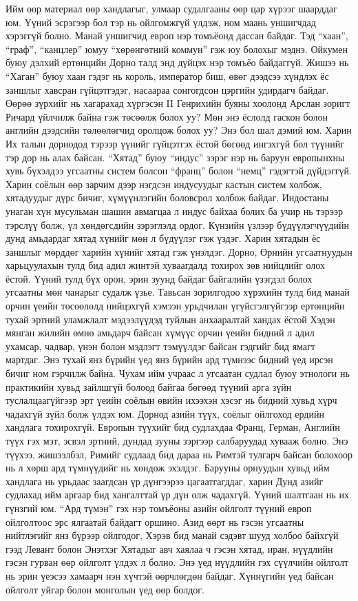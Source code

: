 Ийм өөр материал өөр хандлагыг, улмаар судалгааны өөр цар хүрээг шаарддаг юм. Үүний эсрэгээр бол тэр нь ойлгомжгүй үлдэж, ном маань уншигчдад хэрэггүй болно. Манай уншигчид европ нэр томъёонд дассан байдаг. Тэд “хаан”, “граф”, “канцлер” юмуу “хөрөнгөтний коммун” гэж юу болохыг мэднэ. Ойкумен буюу дэлхий ертөнцийн Дорно талд энд дүйцэх нэр томъёо байдаггүй. Жишээ нь “Хаган” буюу хаан гэдэг нь король, император биш, өвөг дээдсээ хүндлэх ёс заншлыг хавсран гүйцэтгэдэг, насаараа сонгогдсон цэргийн удирдагч байдаг. Өөрөө зүрхийг нь хагарахад хүргэсэн II Генрихийн буяны хоолонд Арслан зоригт Ричард үйлчилж байна гэж төсөөлж болох уу? Мөн энэ ёслолд гаскон болон английн дээдсийн төлөөлөгчид оролцож болох уу? Энэ бол шал дэмий юм. Харин Их талын дорнодод тэрээр үүнийг гүйцэтгэх ёстой бөгөөд ингэхгүй бол түүнийг тэр дор нь алах байсан.
“Хятад” буюу “индус” зэрэг нэр нь баруун европынхны хувь бүхэлдээ угсаатны систем болсон “франц” болон “немц” гэдэгтэй дүйдэггүй. Харин соёлын өөр зарчим дээр нэгдсэн индусуудыг кастын систем холбож, хятадуудыг дүрс бичиг, хүмүүнлэгийн боловсрол холбож байдаг. Индостаны унаган хүн мусульман шашин авмагцаа л индус байхаа болих ба учир нь тэрээр тэрслүү болж, үл хөндөгсдийн зэрэглэлд ордог. Күнзийн үзлээр бүдүүлэгчүүдийн дунд амьдардаг хятад хүнийг мөн л бүдүүлэг гэж үздэг. Харин хятадын ёс заншлыг мөрддөг харийн хүнийг хятад гэж үнэлдэг.
Дорно, Өрнийн угсаатнуудын харьцуулахын тулд бид адил жинтэй хуваагдалд тохирох зөв нийцлийг олох ёстой. Үүний тулд бүх орон, эрин зуунд байдаг байгалийн үзэгдэл болох угсаатны мөн чанарыг судалж үзье.
Тавьсан зорилгодоо хүрэхийн тулд бид манай орчин үеийн төсөөлөлд нийцэхгүй хэмээн урьдчилан үгүйсгэлгүйгээр ертөнцийн тухай эртний уламжлалт мэдээлүүдэд туйлын анхааралтай хандах ёстой Хэдэн мянган жилийн өмнө амьдарч байсан хүмүүс орчин үеийн бидний л адил ухамсар, чадвар, үнэн болон мэдлэгт тэмүүлдэг байсан гэдгийг бид ямагт мартдаг. Энэ тухай янз бүрийн үед янз бүрийн ард түмнээс бидний үед ирсэн бичиг ном гэрчилж байна. Чухам ийм учраас л угсаатан судлал буюу этнологи нь практикийн хувьд зайлшгүй болоод байгаа бөгөөд түүний арга зүйн туслалцаагүйгээр эрт үеийн соёлын өвийн ихээхэн хэсэг нь бидний хувьд хүрч чадахгүй зүйл болж үлдэх юм.
Дорнод азийн түүх, соёлыг ойлгоход ердийн хандлага тохирохгүй. Европын түүхийг бид судлахдаа Франц, Герман, Английн түүх гэх мэт, эсвэл эртний, дундад зууны зэргээр салбаруудад хувааж болно. Энэ түүхээ, жишээлбэл, Римийг судлаад бид дараа нь Римтэй тулгарч байсан болохоор нь л хөрш ард түмнүүдийг нь хөндөж эхэлдэг. Барууны орнуудын хувьд ийм хандлага нь урьдаас заагдсан үр дүнгээрээ цагаатгагддаг, харин Дунд азийг судлахад ийм аргаар бид хангалттай үр дүн олж чадахгүй. Үүний шалтгаан нь их гүнзгий юм. “Ард түмэн” гэх нэр томъёоны азийн ойлголт түүний европ ойлголтоос эрс ялгаатай байдагт оршино. Азид өөрт нь гэсэн угсаатны нийтлэгийг янз бүрээр ойлгодог, Хэрэв бид манай сэдэвт шууд холбоо байхгүй гээд Левант болон Энэтхэг Хятадыг авч хаялаа ч гэсэн хятад, иран, нүүдлийн гэсэн гурван өөр ойлголт үлдэх л болно. Энэ үед нүүдлийн гэх сүүлчийн ойлголт нь эрин үеэсээ хамаарч нэн хүчтэй өөрчлөгдөн байдаг. Хүннүгийн үед байсан ойлголт уйгар болон монголын үед өөр болдог.
